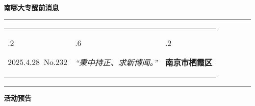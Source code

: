 \documentclass[letterpaper, 12pt]{article}
\begin{document}
\begin{center}
    \Huge\textbf{南哪大专醒前消息}
\end{center}
\vspace{4mm}
\hrule
\renewcommand\tabularxcolumn[1]{m{#1}}
\begin{tabularx}{\textwidth}{>{\hsize.2\hsize}X>{\hsize.6\hsize}X>{\hsize.2\hsize}X}
    \begin{flushleft}
        2025.4.28\, No.232
    \end{flushleft}
    &
    \begin{center}
        \textit{“秉中持正、求新博闻。”}
    \end{center}
    &
    \begin{flushright}
        \textbf{南京市栖霞区}
    \end{flushright}
\end{tabularx}
\vspace{-3.5mm}
\hrule
\vspace{4mm}
\centerline{\huge\textbf{活动预告}}
\end{document}
